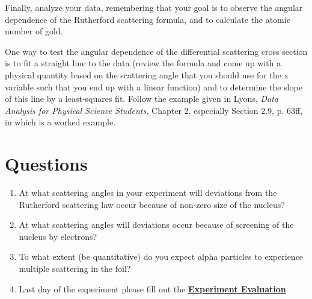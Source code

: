 \documentclass{../lab}
\begin{document}

Finally, analyze your data, remembering that your goal is to observe the angular dependence of the Rutherford scattering formula, and to calculate the atomic number of gold.

One way to test the angular dependence of the differential scattering cross section is to fit a straight line to the data (review the formula and come up with a physical quantity based on the scattering angle that you should use for the x variable such that you end up with a linear function) and to determine the slope of this line by a least-squares fit. Follow the example given in Lyons, \emph{Data Analysis for Physical Science Students, }Chapter 2, especially Section 2.9, p. 63ff, in which is a worked example.

\section{Questions}

\begin{enumerate}
    \item At what scattering angles in your experiment will deviations from the Rutherford scattering law occur because of non-zero size of the nucleus?

    \item At what scattering angles will deviations occur because of screening of the nucleus by electrons?

    \item To what extent (be quantitative) do you expect alpha particles to experience multiple scattering in the foil?

    \item Last day of the experiment please fill out the \href{\ExperimentEvaluation}{\textbf{Experiment Evaluation}}

\end{enumerate}


\end{document}

